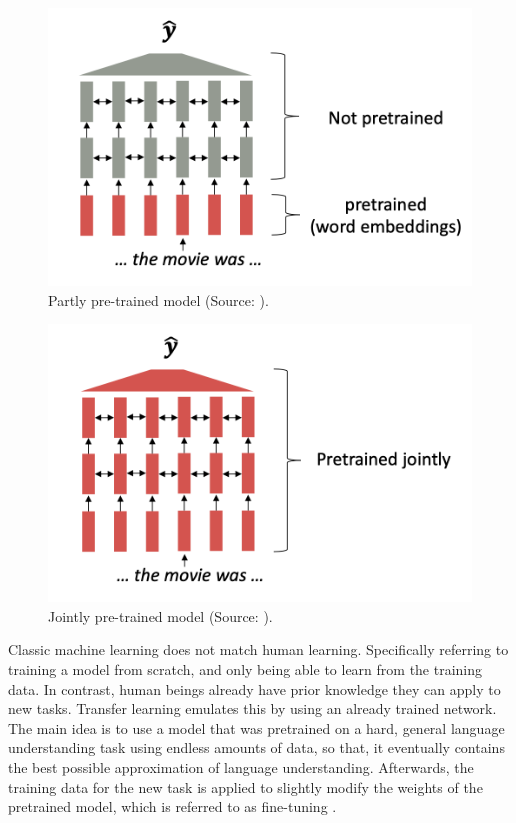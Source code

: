 \documentclass[
]{krantz}
\begin{document}
\begin{figure}

{\centering \includegraphics[width=0.8\linewidth]{./figures/01-01-nlp/transformer_pretrain_stanford} 

}

\caption{Partly pre-trained model (Source: \citet{Manning2022}).}\label{fig:tfpretrain}
\end{figure}



\begin{figure}

{\centering \includegraphics[width=0.8\linewidth]{./figures/01-01-nlp/transformer_pretrain2_stanford} 

}

\caption{Jointly pre-trained model (Source: \citet{Manning2022}).}\label{fig:tfpretrain2}
\end{figure}



Classic machine learning does not match human learning. Specifically
referring to training a model from scratch, and only being able to learn
from the training data. In contrast, human beings already have prior
knowledge they can apply to new tasks. Transfer learning emulates this
by using an already trained network. The main idea is to use a model
that was pretrained on a hard, general language understanding task using
endless amounts of data, so that, it eventually contains the best
possible approximation of language understanding. Afterwards, the
training data for the new task is applied to slightly modify the weights
of the pretrained model, which is referred to as fine-tuning
\citep{Manning2022}.\\
\end{document}
